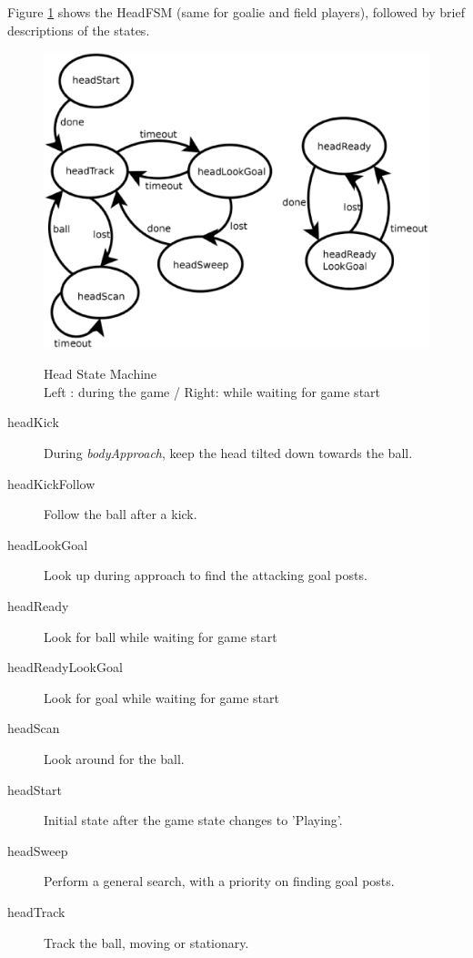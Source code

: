 \documentclass{article}
\begin{document}
	Figure \ref{fig:headfsm} shows the HeadFSM (same for goalie and field players), followed by brief descriptions of the states. 
		
	\begin{figure}[H]
		\centering
		\includegraphics[width=.8\textwidth]{figures/HeadFSM.eps}
		\label{fig:headfsm}
		\caption{Head State Machine\\Left : during the game / Right: while waiting for game start }
		\label{fig:headfsm}
	\end{figure}

	\begin{multicols}{2}
		\begin{description}
			\item[headKick] During \textit{bodyApproach}, keep the head tilted down towards the ball.
			\item[headKickFollow] Follow the ball after a kick.
			\item[headLookGoal] Look up during approach to find the attacking goal posts.
			\item[headReady] Look for ball while waiting for game start
			\item[headReadyLookGoal] Look for goal while waiting for game start
			\item[headScan] Look around for the ball.
			\item[headStart] Initial state after the game state changes to 'Playing'.
			\item[headSweep] Perform a general search, with a priority on finding goal posts.
			\item[headTrack] Track the ball, moving or stationary.
		\end{description}
	\end{multicols}
\end{document}
